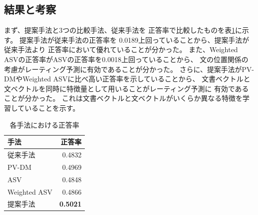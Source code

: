 \documentclass{ttisummary}
\begin{document}
\subsection{結果と考察}

まず、提案手法と3つの比較手法、従来手法\cite{fujitani15}を
正答率で比較したものを表\ref{tab:Accuracies}に示す。
提案手法が従来手法\cite{fujitani15}の正答率を
0.0189上回っていることから、提案手法が従来手法\cite{fujitani15}より
正答率において優れていることが分かった。
また、Weighted ASVの正答率がASVの正答率を0.0018上回っていることから、
文の位置関係の考慮がレーティング予測に有効であることが分かった。
さらに、提案手法がPV-DMやWeighted ASVに比べ高い正答率を示していることから、
文書ベクトルと文ベクトルを同時に特徴量として用いることがレーティング予測に
有効であることが分かった。
これは文書ベクトルと文ベクトルがいくらか異なる特徴を学習していることを示す。

\begin{table}[b!]
  \caption{各手法における正答率}
  \centering
  \begin{tabular}{l | r} \label{tab:Accuracies}
    手法 & 正答率 \\
    \hline
    従来手法\cite{fujitani15}  & 0.4832 \\
    PV-DM & 0.4969 \\
    ASV & 0.4848 \\
    Weighted ASV & 0.4866 \\
    提案手法 & \textbf{0.5021} \\
  \end{tabular}
\end{table}
\end{document}
